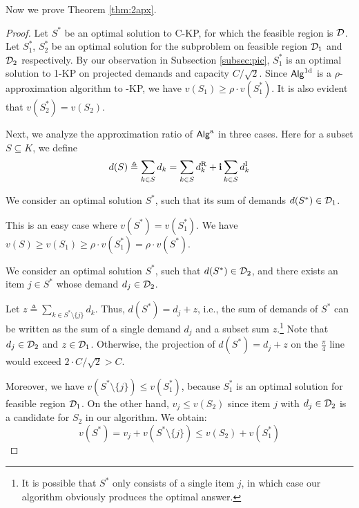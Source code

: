 \documentclass{aamas2013}
\begin{document}
Now we prove Theorem \ref{thm:2apx}.
\begin{proof}
Let $S^*$ be an optimal solution to C-KP, for which the feasible region is $\cal D$.  Let $S_1^*$, $S_2^*$ be an optimal solution for the subproblem on feasible region ${\cal D}_1$ and ${\cal D}_2$ respectively.  By our observation in Subsection \ref{subsec:pic}, $S_1^*$ is an optimal solution to 1-KP on projected demands and capacity $C/\sqrt{2}$.  Since ${\sf Alg}^{\rm 1d}$ is a $\rho$-approximation algorithm to {-KP}, we have $v(S_1)\geq \rho \cdot v(S_1^*)$.  It is also evident that $v(S_2^*)=v(S_2)$.

Next, we analyze the approximation ratio of ${\sf Alg}^{\rm a}$ in three cases.  Here for a subset $S \subseteq K$, we define 
\begin{equation*}
d(S) \triangleq \sum_{k\in S} d_k=\sum_{k\in S} d_k^{\rm R}+ {\bf i}\sum_{k\in S} d_k^{\rm I} 
\end{equation*}

 We consider an optimal solution $S^\ast$, such that its sum of demands $d({S^\ast})\in {\cal D}_1$.  

This is an easy case where $v({S^\ast})=v({S_1^\ast})$.  We have $v(S) \ge v(S_1)\ge  \rho \cdot v({S_1^\ast})=\rho \cdot v({S^\ast})$.
\vskip 5pt

 We consider an optimal solution $S^\ast$, such that $d({S^\ast})\in {\cal D}_2$, and there exists an item $j\in S^\ast$ whose demand $d_j\in {\cal D}_2$.  

Let $z \triangleq \sum_{k\in S^\ast\setminus\{j\}} d_k$. Thus, $d({S^\ast})=d_j+z$, i.e., the sum of demands of $S^\ast$ can be written as the sum of a single demand $d_j$ and a subset sum $z$.\footnote{It is possible that $S^{\ast}$ only consists of a single item $j$, in which case our algorithm obviously produces the optimal answer.}  Note that $d_j\in {\cal D}_2$ and $z\in {\cal D}_1$. Otherwise, the projection of $d({S^\ast})=d_j+z$ on the $\frac{\pi}{4}$ line would exceed $2\cdot C/\sqrt{2}>C$.  

Moreover, we have $v({S^\ast\setminus\{j\}}) \le  v({S_1^\ast})$, because $S_1^\ast$ is an optimal solution for feasible region ${\cal D}_1$.  On the other hand, $v_j \le v({S_2})$ since item $j$ with $d_j\in {\cal D}_2$ is a candidate for $S_2$ in our algorithm.  
We obtain:
\begin{equation*}
v({S^\ast})=v_j+v({S^\ast\setminus\{j\}}) \le  v({S_2})+v({S_1^\ast})
\end{equation*}


\end{proof}
\end{document}
